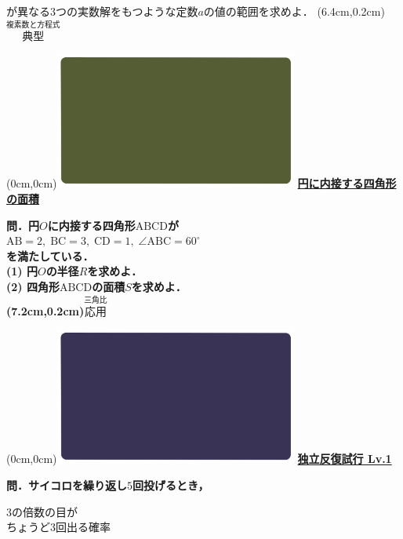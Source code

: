 \documentclass[10pt,
fleqn,
dvipdfmx,
uplatex
]{jsarticle}
\begin{document}
\Large 
が異なる$3$つの実数解をもつような定数$a$の値の範囲を求めよ．
\at(6.4cm,0.2cm){\small\color{bradorange}$\overset{\text{複素数と方程式}}{\text{典型}}$}

\newpage

\at(0cm,0cm){\includegraphics[width=8cm,bb=0 0 1920 1080]{./youtube/thumbnails/templates/smart_background/三角比.jpeg}}
{\color{orange}\bf\boldmath\Large\underline{円に内接する四角形の面積}}\vspace{0.3zw}

\normalsize 
\bf\boldmath 問．円$O$に内接する四角形$\text{ABCD}$が\\
\hspace{0.3zw}$\text{AB}=2,\;\text{BC}=3,\;\text{CD}=1,\;\angle \text{ABC}={60}^\circ$\\
を満たしている．\\
\large
(1)  円$O$の半径$R$を求めよ．\\
(2)  四角形$\text{ABCD}$の面積$S$を求めよ．\\

\at(7.2cm,0.2cm){\small\color{bradorange}$\overset{\text{三角比}}{\text{応用}}$}



\newpage

\at(0cm,0cm){\includegraphics[width=8cm,bb=0 0 1920 1080]{./youtube/thumbnails/templates/smart_background/確率.jpeg}}
{\color{orange}\bf\boldmath\huge\underline{独立反復試行 Lv.1 }}\vspace{0.3zw}

\large 
\bf\boldmath 問．サイコロを繰り返し$5$回投げるとき，

\huge 
$3$の倍数の目が\\
\hfill ちょうど$3$回出る確率
\end{document}
